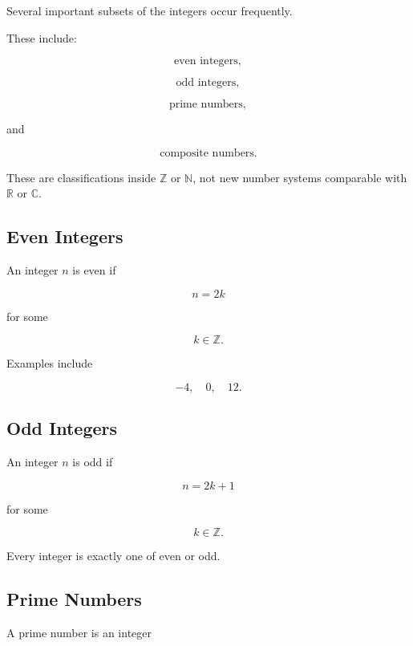 Several important subsets of the integers occur frequently.

These include:

\[
\boxed{
\text{even integers},
}
\]

\[
\boxed{
\text{odd integers},
}
\]

\[
\boxed{
\text{prime numbers},
}
\]

and

\[
\boxed{
\text{composite numbers}.
}
\]

These are classifications inside \(\mathbb{Z}\) or \(\mathbb{N}\), not new
number systems comparable with \(\mathbb{R}\) or \(\mathbb{C}\).

\subsection{Even Integers}
\label{subsec:even-integers-reference}

An integer \(n\) is even if

\[
\boxed{
n=2k
}
\]

for some

\[
k\in\mathbb{Z}.
\]

Examples include

\[
\boxed{
-4,
\quad
0,
\quad
12.
}
\]

\subsection{Odd Integers}
\label{subsec:odd-integers-reference}

An integer \(n\) is odd if

\[
\boxed{
n=2k+1
}
\]

for some

\[
k\in\mathbb{Z}.
\]

Every integer is exactly one of even or odd.

\subsection{Prime Numbers}
\label{subsec:prime-numbers-reference}

A prime number is an integer

